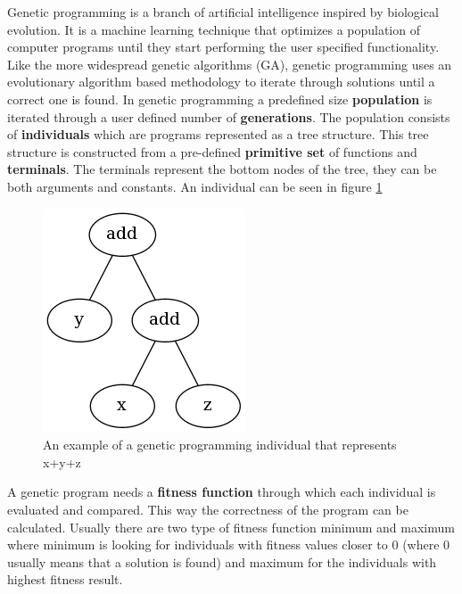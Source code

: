 Genetic programming is a branch of artificial intelligence inspired by biological evolution. It is a machine learning
technique that optimizes a population of computer programs until they start performing the user specified
functionality. Like the more widespread genetic algorithms (GA), genetic programming uses an evolutionary algorithm
based methodology to iterate through solutions until a correct one is found. In genetic programming a 
predefined size \textbf{population} is iterated through a user defined number of \textbf{generations}. 
The population consists of \textbf{individuals} which are programs represented as a tree structure.
This tree structure is constructed from a pre-defined \textbf{primitive set} of functions and \textbf{terminals}.
The terminals represent the bottom nodes of the tree, they can be both arguments and constants. An individual
can be seen in figure \ref{fig:ind}
\begin{figure}[htp]
\centering
\includegraphics[scale=0.6]{Figures/ind.png}
\caption{An example of a genetic programming individual that represents x+y+z}
\label{fig:ind}
\end{figure}
A genetic program needs a \textbf{fitness function} through which each individual
is evaluated and compared. This way the correctness of the program can be calculated. Usually there are two type of fitness function 
minimum and maximum where minimum is looking for individuals with fitness values closer to 0 (where 0 usually means that a solution is found)
and maximum for the individuals with highest fitness result.
